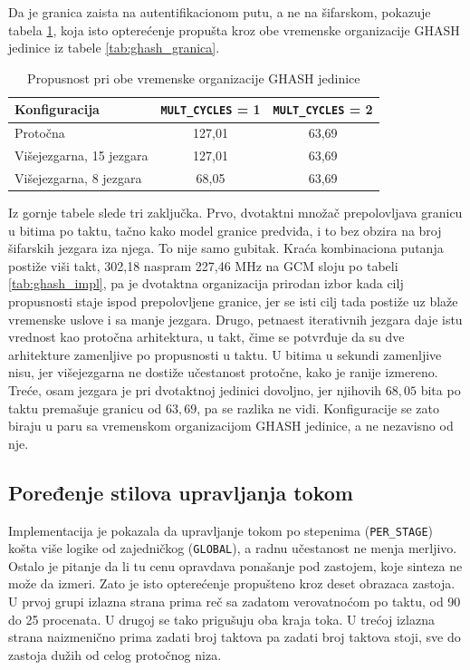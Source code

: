 Da je granica zaista na autentifikacionom putu, a ne na šifarskom, pokazuje tabela \ref{tab:aes_ghash_mera}, koja isto opterećenje propušta kroz obe vremenske organizacije GHASH jedinice iz tabele \ref{tab:ghash_granica}.

\begin{table}[H]
\caption{Propusnost pri obe vremenske organizacije GHASH jedinice}
\centering
{\renewcommand{\arraystretch}{1.25}\setlength{\tabcolsep}{10pt}
\begin{tabular}{|l|c|c|}
\hline
\rowcolor{gray!30}
Konfiguracija & \texttt{MULT\_CYCLES} = 1 & \texttt{MULT\_CYCLES} = 2 \\
\hline
Protočna                & 127,01 & 63,69 \\
\hline
Višejezgarna, 15 jezgara & 127,01 & 63,69 \\
\hline
Višejezgarna, 8 jezgara  & 68,05  & 63,69 \\
\hline
\end{tabular}
}
\label{tab:aes_ghash_mera}
\end{table}

Iz gornje tabele slede tri zaključka. Prvo, dvotaktni množač prepolovljava granicu u bitima po taktu, tačno kako model granice predviđa, i to bez obzira na broj šifarskih jezgara iza njega. To nije samo gubitak. Kraća kombinaciona putanja postiže viši takt, 302,18 naspram 227,46 MHz na GCM sloju po tabeli \ref{tab:ghash_impl}, pa je dvotaktna organizacija prirodan izbor kada cilj propusnosti staje ispod prepolovljene granice, jer se isti cilj tada postiže uz blaže vremenske uslove i sa manje jezgara. Drugo, petnaest iterativnih jezgara daje istu vrednost kao protočna arhitektura, u takt, čime se potvrđuje da su dve arhitekture zamenljive po propusnosti u taktu. U bitima u sekundi zamenljive nisu, jer višejezgarna ne dostiže učestanost protočne, kako je ranije izmereno. Treće, osam jezgara je pri dvotaktnoj jedinici dovoljno, jer njihovih $68{,}05$ bita po taktu premašuje granicu od $63{,}69$, pa se razlika ne vidi. Konfiguracije se zato biraju u paru sa vremenskom organizacijom GHASH jedinice, a ne nezavisno od nje.

\subsection{Poređenje stilova upravljanja tokom}
\label{subsec:rez_aes_protivpritisak}

Implementacija je pokazala da upravljanje tokom po stepenima (\texttt{PER\_STAGE}) košta više logike od zajedničkog (\texttt{GLOBAL}), a radnu učestanost ne menja merljivo. Ostalo je pitanje da li tu cenu opravdava ponašanje pod zastojem, koje sinteza ne može da izmeri. Zato je isto opterećenje propušteno kroz deset obrazaca zastoja. U prvoj grupi izlazna strana prima reč sa zadatom verovatnoćom po taktu, od 90 do 25 procenata. U drugoj se tako prigušuju oba kraja toka. U trećoj izlazna strana naizmenično prima zadati broj taktova pa zadati broj taktova stoji, sve do zastoja dužih od celog protočnog niza.

